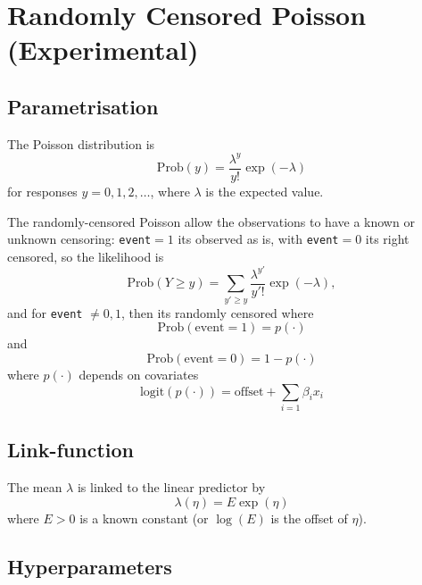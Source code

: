 \documentclass[a4paper,11pt]{article}
\begin{document}
\section*{Randomly Censored Poisson (Experimental)}

\subsection*{Parametrisation}

The Poisson distribution is
\begin{displaymath}
    \text{Prob}(y) = \frac{\lambda^{y}}{y!}\exp(-\lambda)
\end{displaymath}
for responses $y=0, 1, 2, \ldots$, where $\lambda$ is the expected
value.

The randomly-censored Poisson allow the observations to have a known
or unknown censoring: \texttt{event}$=1$ its observed as is, with
\texttt{event}$=0$ its right censored, so the likelihood is
\begin{displaymath}
    \text{Prob}(Y \ge y) = \sum_{y' \ge y} \frac{\lambda^{y'}}{y'!}\exp(-\lambda),
\end{displaymath}
and for \texttt{event} $\not=0,1$, then its randomly censored where
\begin{displaymath}
    \text{Prob}(\text{event} = 1) = p(\cdot)
\end{displaymath}
and 
\begin{displaymath}
    \text{Prob}(\text{event} = 0) = 1-p(\cdot)
\end{displaymath}
where $p(\cdot)$ depends on covariates
\begin{displaymath}
    \text{logit}(p(\cdot)) = \text{offset} + \sum_{i=1} \beta_i x_i
\end{displaymath}


\subsection*{Link-function}

The mean $\lambda$ is linked to the linear predictor by
\begin{displaymath}
    \lambda(\eta) = E \exp(\eta)
\end{displaymath}
where $E>0$ is a known constant (or $\log(E)$ is the offset of $\eta$).

\subsection*{Hyperparameters}
\end{document}
